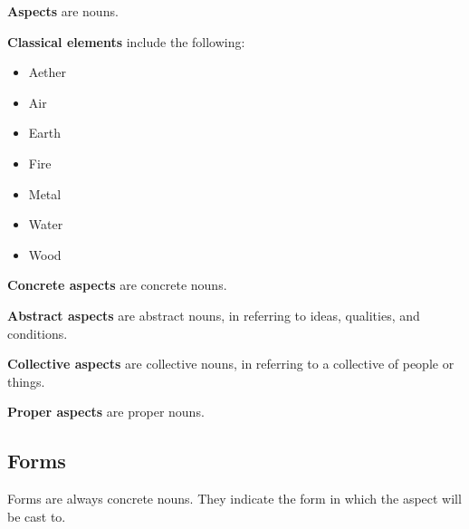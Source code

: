 \documentclass[12pt,]{article}
\providecommand{\tightlist}{%
  \setlength{\itemsep}{0pt}\setlength{\parskip}{0pt}}
\begin{document}
\textbf{Aspects} are nouns.

\textbf{Classical elements} include the following:

\begin{itemize}
\tightlist
\item
  Aether
\item
  Air
\item
  Earth
\item
  Fire
\item
  Metal
\item
  Water
\item
  Wood
\end{itemize}

\textbf{Concrete aspects} are concrete nouns.

\textbf{Abstract aspects} are abstract nouns, in referring to ideas,
qualities, and conditions.

\textbf{Collective aspects} are collective nouns, in referring to a
collective of people or things.

\textbf{Proper aspects} are proper nouns.

\subsection{Forms}\label{forms}

Forms are always concrete nouns. They indicate the form in which the
aspect will be cast to.
\end{document}
